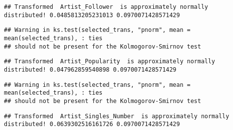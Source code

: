 \documentclass[
]{article}
\newenvironment{Shaded}{\begin{snugshade}}{\end{snugshade}}
\newcommand{\ControlFlowTok}[1]{\textcolor[rgb]{0.13,0.29,0.53}{\textbf{#1}}}
\newcommand{\DataTypeTok}[1]{\textcolor[rgb]{0.13,0.29,0.53}{#1}}
\newcommand{\FloatTok}[1]{\textcolor[rgb]{0.00,0.00,0.81}{#1}}
\newcommand{\KeywordTok}[1]{\textcolor[rgb]{0.13,0.29,0.53}{\textbf{#1}}}
\newcommand{\NormalTok}[1]{#1}
\newcommand{\OperatorTok}[1]{\textcolor[rgb]{0.81,0.36,0.00}{\textbf{#1}}}
\newcommand{\StringTok}[1]{\textcolor[rgb]{0.31,0.60,0.02}{#1}}
\begin{document}
\begin{Shaded}
\end{Shaded}

\begin{verbatim}
## Transformed  Artist_Follower  is approximately normally distributed! 0.0485813205231013 0.0970071428571429
\end{verbatim}

\begin{verbatim}
## Warning in ks.test(selected_trans, "pnorm", mean = mean(selected_trans), : ties
## should not be present for the Kolmogorov-Smirnov test
\end{verbatim}

\begin{verbatim}
## Transformed  Artist_Popularity  is approximately normally distributed! 0.047962859540898 0.0970071428571429
\end{verbatim}

\begin{verbatim}
## Warning in ks.test(selected_trans, "pnorm", mean = mean(selected_trans), : ties
## should not be present for the Kolmogorov-Smirnov test
\end{verbatim}

\begin{verbatim}
## Transformed  Artist_Singles_Number  is approximately normally distributed! 0.0639302516161726 0.0970071428571429
\end{verbatim}
\end{document}
